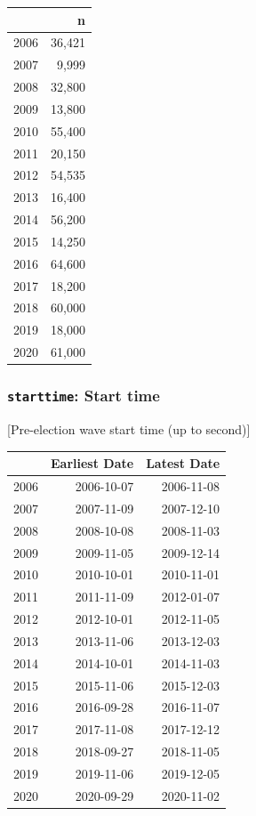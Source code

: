 \documentclass[10pt,article,oneside]{memoir}
\theoremstyle{definition}
\begin{document}
\begin{table}[H]
\centering
\begin{tabular}{lr}
\toprule
 & n\\
\midrule
2006 & 36,421\\
2007 & 9,999\\
2008 & 32,800\\
2009 & 13,800\\
2010 & 55,400\\
2011 & 20,150\\
2012 & 54,535\\
2013 & 16,400\\
2014 & 56,200\\
2015 & 14,250\\
2016 & 64,600\\
2017 & 18,200\\
2018 & 60,000\\
2019 & 18,000\\
2020 & 61,000\\
\bottomrule
\end{tabular}
\end{table}

\hypertarget{starttime-start-time}{%
\subsubsection{\texorpdfstring{\texttt{starttime}: Start
time}{starttime: Start time}}\label{starttime-start-time}}

{[}Pre-election wave start time (up to second){]}

\begin{table}[H]
\centering
\begin{tabular}{lrr}
\toprule
 & Earliest Date & Latest Date\\
\midrule
2006 & 2006-10-07 & 2006-11-08\\
2007 & 2007-11-09 & 2007-12-10\\
2008 & 2008-10-08 & 2008-11-03\\
2009 & 2009-11-05 & 2009-12-14\\
2010 & 2010-10-01 & 2010-11-01\\
2011 & 2011-11-09 & 2012-01-07\\
2012 & 2012-10-01 & 2012-11-05\\
2013 & 2013-11-06 & 2013-12-03\\
2014 & 2014-10-01 & 2014-11-03\\
2015 & 2015-11-06 & 2015-12-03\\
2016 & 2016-09-28 & 2016-11-07\\
2017 & 2017-11-08 & 2017-12-12\\
2018 & 2018-09-27 & 2018-11-05\\
2019 & 2019-11-06 & 2019-12-05\\
2020 & 2020-09-29 & 2020-11-02\\
\bottomrule
\end{tabular}
\end{table}
\end{document}
